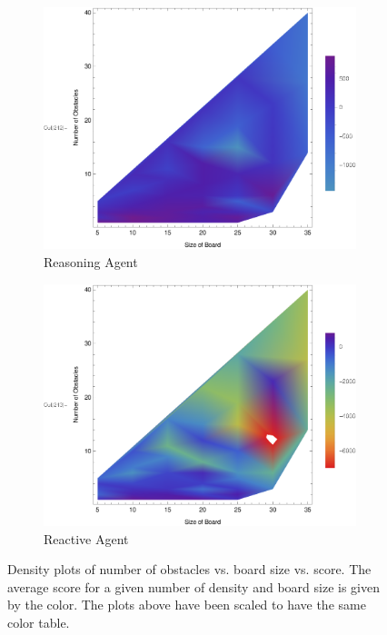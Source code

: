 \documentclass{article}
\begin{document}
		\begin{figure}[h!]
			\centering
			\begin{subfigure}[b]{0.47\textwidth}
							\centering
							\includegraphics[width=\textwidth]{images/density_reason}
							\caption{Reasoning Agent}
				\end{subfigure}
				\begin{subfigure}[b]{0.47\textwidth}
					\centering
					\includegraphics[width=\textwidth]{images/density_react}
					\caption{Reactive Agent}
				\end{subfigure}
				\caption{Density plots of number of obstacles vs. board size vs. score. The average score for a given number of density and board size is given by the color. The plots above have been scaled to have the same color table.}
		\end{figure}
		
\end{document}
